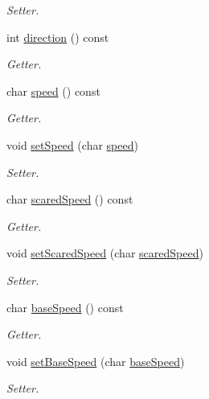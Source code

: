 \begin{DoxyCompactItemize}
\begin{DoxyCompactList}\small\item\em Setter. \end{DoxyCompactList}\item 
int \hyperlink{class_unit_a5d8a5a789acfa4d2502b0c1082876172}{direction} () const 
\begin{DoxyCompactList}\small\item\em Getter. \end{DoxyCompactList}\item 
char \hyperlink{class_unit_a41b1fa4f39ca207da3ad30202b341cd7}{speed} () const 
\begin{DoxyCompactList}\small\item\em Getter. \end{DoxyCompactList}\item 
void \hyperlink{class_unit_aa1b69d788d11e91ed7b9142cfb1bedfb}{set\+Speed} (char \hyperlink{class_unit_a41b1fa4f39ca207da3ad30202b341cd7}{speed})
\begin{DoxyCompactList}\small\item\em Setter. \end{DoxyCompactList}\item 
char \hyperlink{class_unit_a3112ab535d2bf6faef29cb4c4685d43f}{scared\+Speed} () const 
\begin{DoxyCompactList}\small\item\em Getter. \end{DoxyCompactList}\item 
void \hyperlink{class_unit_ae9d92b8ca322719ca8c9a994108d749b}{set\+Scared\+Speed} (char \hyperlink{class_unit_a3112ab535d2bf6faef29cb4c4685d43f}{scared\+Speed})
\begin{DoxyCompactList}\small\item\em Setter. \end{DoxyCompactList}\item 
char \hyperlink{class_unit_a3e8b2e19d807aadc384e5a2092c6bc5c}{base\+Speed} () const 
\begin{DoxyCompactList}\small\item\em Getter. \end{DoxyCompactList}\item 
void \hyperlink{class_unit_a18aa42601bc7e52c2298e87f5ccdd6c5}{set\+Base\+Speed} (char \hyperlink{class_unit_a3e8b2e19d807aadc384e5a2092c6bc5c}{base\+Speed})
\begin{DoxyCompactList}\small\item\em Setter. \end{DoxyCompactList}\item 

\end{DoxyCompactItemize}
